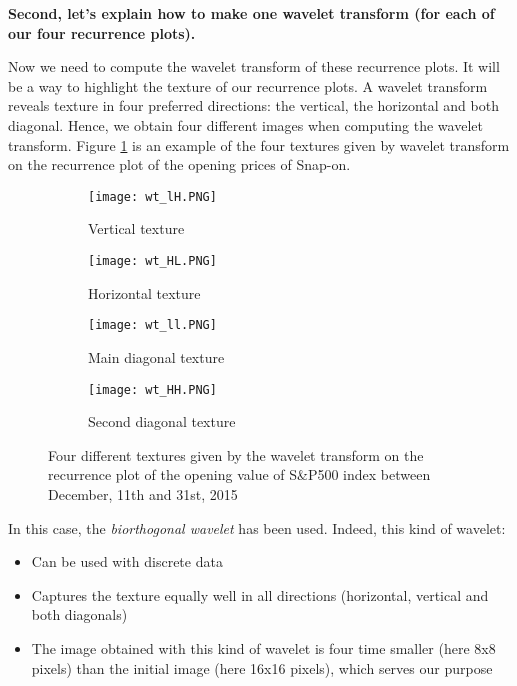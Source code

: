 \documentclass[11pt]{article}
\begin{document}
\begin{onehalfspace}
\noindent \textbf{Second, let's explain how to make one wavelet transform (for each of our four recurrence plots).}

Now we need to compute the wavelet transform of these recurrence plots. It will be a way to highlight the texture of our recurrence plots. A wavelet transform reveals texture in four preferred directions: the vertical, the horizontal and both diagonal. Hence, we obtain four different images when computing the wavelet transform. Figure \ref{fig:wave_transf} is an example of the four textures given by wavelet transform on the recurrence plot of the opening prices of Snap-on.

\begin{figure}[h!]
    \centering
    \captionsetup{justification=centering}
    \begin{subfigure}{0.24\textwidth}
        \texttt{[image: wt\_lH.PNG]}
        \caption{Vertical texture}
    \end{subfigure}
    \begin{subfigure}{0.24\textwidth}
        \texttt{[image: wt\_HL.PNG]}
        \caption{Horizontal texture}
    \end{subfigure}    
    \begin{subfigure}{0.24\textwidth}
        \texttt{[image: wt\_ll.PNG]}
        \caption{Main diagonal texture}
    \end{subfigure}
    \begin{subfigure}{0.24\textwidth}
        \texttt{[image: wt\_HH.PNG]}
        \caption{Second diagonal texture}
    \end{subfigure}
    \caption{Four different textures given by the wavelet transform on the recurrence plot of the opening value of S\&P500 index between December, 11th and 31st, 2015}
    \label{fig:wave_transf}
\end{figure}

In this case, the \textit{biorthogonal wavelet} has been used. Indeed, this kind of wavelet:

\begin{itemize}
    \item Can be used with discrete data
    \item Captures the texture equally well in all directions (horizontal, vertical and both diagonals)
    \item The image obtained with this kind of wavelet is four time smaller (here 8x8 pixels) than the initial image (here 16x16 pixels), which serves our purpose
\end{itemize}


\end{onehalfspace}
\end{document}
